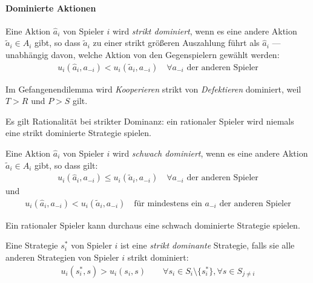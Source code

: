 \paragraph{Dominierte Aktionen}%
\label{par:dominierte_aktionen}

\begin{definition}
  Eine Aktion $\hat{a}_i$ von Spieler $i$ wird \emph{strikt dominiert},
  wenn es eine andere Aktion $\tilde{a}_i \in A_i$ gibt,
  so dass $\tilde{a}_i$ zu einer strikt größeren Auszahlung führt als $\hat{a}_i$
  — unabhängig davon, welche Aktion von den Gegenspielern gewählt werden:
  \begin{align*}
    u_i(\hat{a}_i, a_{-i}) < u_i(\tilde{a}_i, a_{-i})
    \quad
    \forall a_{-i} \text{ der anderen Spieler}
  \end{align*}
\end{definition}

Im Gefangenendilemma wird \emph{Kooperieren} strikt von \emph{Defektieren} dominiert, weil
$T > R$ und $P > S$ gilt.

Es gilt Rationalität bei strikter Dominanz: ein rationaler Spieler wird niemals eine
strikt dominierte Strategie spielen.

\begin{definition}
  Eine Aktion $\hat{a}_i$ von Spieler $i$ wird \emph{schwach dominiert}, wenn es eine
  andere Aktion $\tilde{a}_i \in A_i$ gibt, so dass gilt:
  \begin{align*}
    u_i(\hat{a}_i, a_{-i}) \leq u_i(\tilde{a}_i, a_{-i})
    \quad \forall a_{-i} \text{ der anderen Spieler}
  \end{align*}
  und
  \begin{align*}
    u_i(\hat{a}_i, a_{-i}) < u_i(\tilde{a}_i, a_{-i})
    \quad \text{für mindestens ein $a_{-i}$ der anderen Spieler}
  \end{align*}
\end{definition}

Ein rationaler Spieler kann durchaus eine schwach dominierte Strategie spielen.

\begin{definition}
  Eine Strategie $s^*_i$ von Spieler $i$ ist eine \emph{strikt dominante} Strategie, falls
  sie alle anderen Strategien von Spieler $i$ strikt dominiert:
  \begin{align*}
    u_i(s^*_i, s) > u_i(s_i, s) \qquad
    \forall s_i \in S_i \setminus \{s^*_i\},
    \forall s \in S_{j \neq i}
  \end{align*}
\end{definition}


